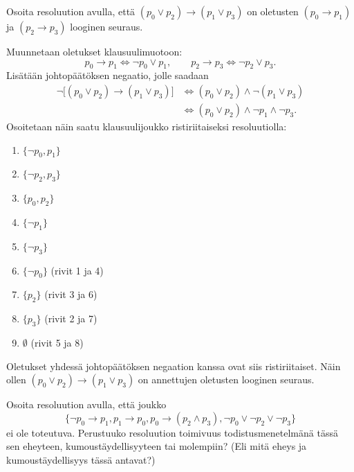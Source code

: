 \documentclass[11pt,a4paper]{amsart}
\begin{document}
\begin{exercise}
Osoita resoluution avulla, että \((p_0 \lor p_2) \rightarrow (p_1 \lor p_3)\)
on oletusten \((p_0 \rightarrow p_1)\) ja \((p_2 \rightarrow p_3)\)
looginen seuraus.
\end{exercise}

\begin{solution}
Muunnetaan oletukset klausuulimuotoon:
\[
p_0\to p_1\iff\neg p_0\lor p_1,
\qquad
p_2\to p_3\iff\neg p_2\lor p_3.
\]
Lisätään johtopäätöksen negaatio, jolle saadaan
\[
\begin{aligned}
\neg\big[(p_0\lor p_2)\to(p_1\lor p_3)\big]
&\iff (p_0\lor p_2)\land\neg(p_1\lor p_3)\\
&\iff (p_0\lor p_2)\land\neg p_1\land\neg p_3.
\end{aligned}
\]
Osoitetaan näin saatu klausuulijoukko ristiriitaiseksi resoluutiolla:
\begin{enumerate}[label=\arabic*., nosep]
\item \(\{\neg p_0,p_1\}\)
\item \(\{\neg p_2,p_3\}\)
\item \(\{p_0,p_2\}\)
\item \(\{\neg p_1\}\)
\item \(\{\neg p_3\}\)
\item \(\{\neg p_0\}\) (rivit 1 ja 4)
\item \(\{p_2\}\) (rivit 3 ja 6)
\item \(\{p_3\}\) (rivit 2 ja 7)
\item \(\emptyset\) (rivit 5 ja 8)
\end{enumerate}
Oletukset yhdessä johtopäätöksen negaation kanssa ovat siis ristiriitaiset.
Näin ollen \((p_0\lor p_2)\to(p_1\lor p_3)\) on annettujen oletusten
looginen seuraus.
\end{solution}

\begin{exercise}
Osoita resoluution avulla, että joukko
\[
\{\neg p_0 \rightarrow p_1, p_1 \rightarrow p_0,
p_0 \rightarrow (p_2 \land p_3), \neg p_0 \lor \neg p_2 \lor \neg p_3\}
\]
ei ole toteutuva. Perustuuko resoluution toimivuus todistusmenetelmänä tässä
sen eheyteen, kumoustäydellisyyteen tai molempiin? (Eli mitä eheys ja
kumoustäydellisyys tässä antavat?)
\end{exercise}
\end{document}
